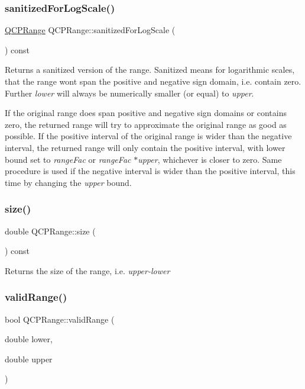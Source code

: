 \subsubsection{\texorpdfstring{sanitized\+For\+Log\+Scale()}{sanitizedForLogScale()}}
{\footnotesize\ttfamily \hyperlink{class_q_c_p_range}{Q\+C\+P\+Range} Q\+C\+P\+Range\+::sanitized\+For\+Log\+Scale (\begin{DoxyParamCaption}{ }\end{DoxyParamCaption}) const}

Returns a sanitized version of the range. Sanitized means for logarithmic scales, that the range won\textquotesingle{}t span the positive and negative sign domain, i.\+e. contain zero. Further {\itshape lower} will always be numerically smaller (or equal) to {\itshape upper}.

If the original range does span positive and negative sign domains or contains zero, the returned range will try to approximate the original range as good as possible. If the positive interval of the original range is wider than the negative interval, the returned range will only contain the positive interval, with lower bound set to {\itshape range\+Fac} or {\itshape range\+Fac} $\ast${\itshape upper}, whichever is closer to zero. Same procedure is used if the negative interval is wider than the positive interval, this time by changing the {\itshape upper} bound. \mbox{\label{class_q_c_p_range_a62326e7cc4316b96df6a60813230e63f}} 
\subsubsection{\texorpdfstring{size()}{size()}}
{\footnotesize\ttfamily double Q\+C\+P\+Range\+::size (\begin{DoxyParamCaption}{ }\end{DoxyParamCaption}) const\hspace{0.3cm}{\ttfamily [inline]}}

Returns the size of the range, i.\+e. {\itshape upper-\/{\itshape lower} } \mbox{\label{class_q_c_p_range_ab38bd4841c77c7bb86c9eea0f142dcc0}} 
\subsubsection{\texorpdfstring{valid\+Range()}{validRange()}\hspace{0.1cm}{\footnotesize\ttfamily [1/2]}}
{\footnotesize\ttfamily bool Q\+C\+P\+Range\+::valid\+Range (\begin{DoxyParamCaption}\item[{double}]{lower,  }\item[{double}]{upper }\end{DoxyParamCaption})\hspace{0.3cm}{\ttfamily [static]}}

